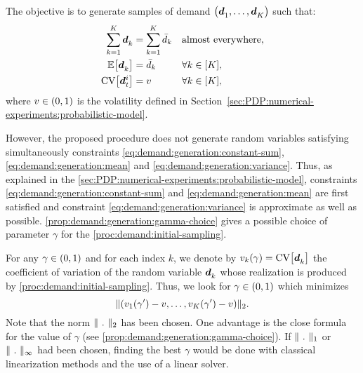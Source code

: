 The objective is to generate samples of demand $\bracket{\va\demand_1,\ldots,\va\demand_K}$ such that:
\begin{subequations}
  \begin{align}
    \sum_{k=1}^K \va\demand_k &= \sum_{k=1}^K \bar{\demand}_k && \mbox{almost everywhere},
    \label{eq:demand:generation:constant-sum}
    \\
    \espe\sqbracket{\va\demand_k} &= \bar{\demand}_k && \forall k\in\range{K},
    \label{eq:demand:generation:mean}
    \\
    \CV\sqbracket{\va\demand_t^i} &= v && \forall k\in\range{K},
    \label{eq:demand:generation:variance}
  \end{align}
\end{subequations}
where $v\in\bracket{0,1}$ is the volatility defined in Section~\cref{sec:PDP:numerical-experiments:probabilistic-model}.


However, the proposed procedure does not generate random variables satisfying simultaneously constraints \eqref{eq:demand:generation:constant-sum}, \eqref{eq:demand:generation:mean} and \eqref{eq:demand:generation:variance}.
Thus, as explained in the \cref{sec:PDP:numerical-experiments:probabilistic-model}, constraints \eqref{eq:demand:generation:constant-sum} and \eqref{eq:demand:generation:mean} are first satisfied and constraint \eqref{eq:demand:generation:variance} is approximate as well as possible.
\cref{prop:demand:generation:gamma-choice} gives a possible choice of parameter $\gamma$ for the \cref{proc:demand:initial-sampling}.

For any $\gamma\in\bracket{0,1}$ and for each index $k$, we denote by $v_k\bracket{\gamma}=\CV\sqbracket{\va\demand_k}$ the coefficient of variation of the random variable $\va\demand_k$ whose realization is produced by \cref{proc:demand:initial-sampling}.
Thus, we look for $\gamma\in\bracket{0,1}$ which minimizes
\begin{equation}
  \norm{\bracket{v_1(\gamma')-v,\ldots,v_K(\gamma')-v}}_2.
\end{equation}
Note that the norm $\norm{\ .\ }_2$ has been chosen.
One advantage is the close formula for the value of $\gamma$ (see \cref{prop:demand:generation:gamma-choice}).
If $\norm{\ .\ }_1$ or $\norm{\ .\ }_{\infty}$ had been chosen, finding the best $\gamma$ would be done with classical linearization methods and the use of a linear solver.


